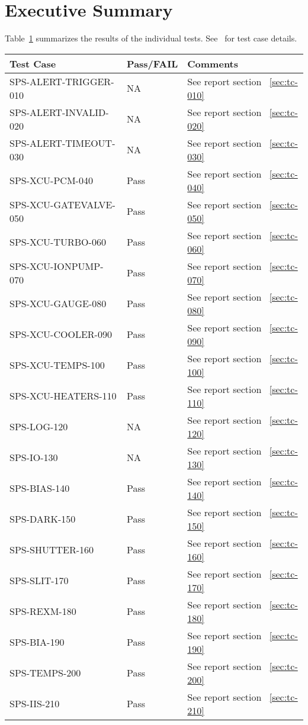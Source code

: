 \section{Executive Summary}

Table~\ref{tab:summary-table} summarizes the results of the individual tests.
See~\cite{LAMTRE1072} for test case details.

\begin{table}[H]
    \begin{tabular}{|p{6cm}|l| p{7cm} | }
    \hline
    {\bf Test Case} & {\bf Pass/FAIL} & {\bf Comments} \\ \hline
    SPS-ALERT-TRIGGER-010 & NA & See report section ~\ref{sec:tc-010} \\ \hline
    SPS-ALERT-INVALID-020 & NA & See report section ~\ref{sec:tc-020} \\ \hline
    SPS-ALERT-TIMEOUT-030 & NA & See report section ~\ref{sec:tc-030} \\ \hline
    SPS-XCU-PCM-040 & Pass & See report section ~\ref{sec:tc-040} \\ \hline
    SPS-XCU-GATEVALVE-050 & Pass & See report section ~\ref{sec:tc-050} \\ \hline
    SPS-XCU-TURBO-060 & Pass & See report section ~\ref{sec:tc-060} \\ \hline
    SPS-XCU-IONPUMP-070 & Pass & See report section ~\ref{sec:tc-070} \\ \hline
    SPS-XCU-GAUGE-080 & Pass & See report section ~\ref{sec:tc-080} \\ \hline
    SPS-XCU-COOLER-090 & Pass & See report section ~\ref{sec:tc-090} \\ \hline
    SPS-XCU-TEMPS-100 & Pass & See report section ~\ref{sec:tc-100} \\ \hline
    SPS-XCU-HEATERS-110 & Pass & See report section ~\ref{sec:tc-110} \\ \hline
    SPS-LOG-120 & NA & See report section ~\ref{sec:tc-120} \\ \hline
    SPS-IO-130 & NA & See report section ~\ref{sec:tc-130} \\ \hline
    SPS-BIAS-140 & Pass & See report section ~\ref{sec:tc-140} \\ \hline
    SPS-DARK-150 & Pass & See report section ~\ref{sec:tc-150} \\ \hline
    SPS-SHUTTER-160 & Pass & See report section ~\ref{sec:tc-160} \\ \hline
    SPS-SLIT-170 & Pass & See report section ~\ref{sec:tc-170} \\ \hline
    SPS-REXM-180 & Pass & See report section ~\ref{sec:tc-180} \\ \hline
    SPS-BIA-190 & Pass & See report section ~\ref{sec:tc-190} \\ \hline
    SPS-TEMPS-200 & Pass & See report section ~\ref{sec:tc-200} \\ \hline
    SPS-IIS-210 & Pass & See report section ~\ref{sec:tc-210} \\ \hline

    \end{tabular}
\label{tab:summary-table}
\end{table}

